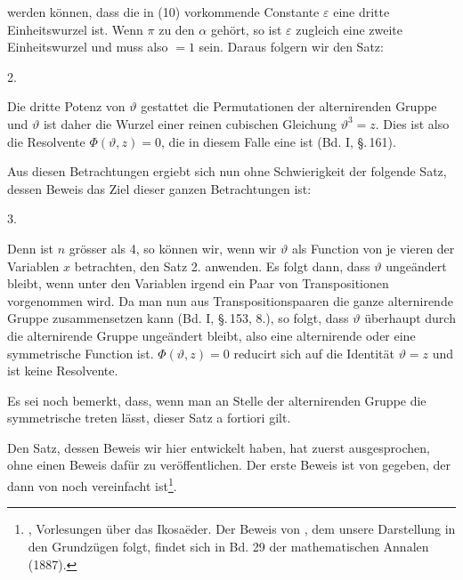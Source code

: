 werden können, dass die in (10) vorkommende Constante $\varepsilon$ 
eine dritte Einheitswurzel ist. Wenn $\pi$ zu den $\alpha$ gehört, so ist
$\varepsilon$ zugleich eine zweite Einheitswurzel und muss also $=1$ sein.
Daraus folgern wir den Satz:

2. 

Die dritte Potenz von $\vartheta$ gestattet die Permutationen der
alternirenden Gruppe und $\vartheta$ ist daher die Wurzel einer reinen
cubischen Gleichung $\vartheta^3 = z$. Dies ist also die Resolvente
$\Phi(\vartheta,z) = 0$, die in diesem Falle eine  ist
(Bd. I, \S.\,161).

Aus diesen Betrachtungen ergiebt sich nun ohne
Schwierigkeit der folgende Satz, dessen Beweis das Ziel dieser ganzen
Betrachtungen ist:

3. 

Denn ist $n$ grösser als 4, so können wir, wenn wir $\vartheta$ als
Function von je vieren der Variablen $x$ betrachten, den Satz 2. anwenden.
Es folgt dann, dass $\vartheta$ ungeändert bleibt, wenn unter den
Variablen irgend ein Paar von Transpositionen vorgenommen wird. Da man
nun aus Transpositionspaaren die ganze alternirende Gruppe zusammensetzen
kann (Bd. I, \S.\,153, 8.), so folgt, dass $\vartheta$ überhaupt durch
die alternirende Gruppe ungeändert bleibt, also eine alternirende oder
eine symmetrische Function ist. $\Phi(\vartheta,z) = 0$ reducirt sich auf
die Identität $\vartheta = z$ und ist keine Resolvente.

Es sei noch bemerkt, dass, wenn man an Stelle der alternirenden Gruppe
die symmetrische treten lässt, dieser Satz a fortiori gilt.

Den Satz, dessen Beweis wir hier entwickelt haben, hat zuerst
 ausgesprochen, ohne einen Beweis dafür zu
veröffentlichen. Der erste Beweis ist von  gegeben, der
dann von  noch vereinfacht
ist\footnote{, Vorlesungen über das Ikosaëder. Der
Beweis von , dem unsere Darstellung in den Grundzügen
folgt, findet sich in Bd. 29 der mathematischen Annalen (1887).}.
